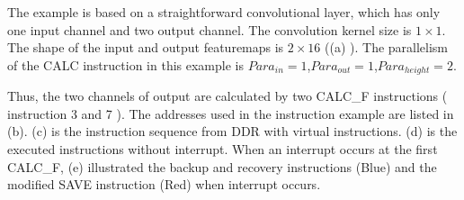 The example is based on a straightforward convolutional layer, which has only one input channel and two output channel. 
The convolution kernel size is $1 \times 1$. The shape of the input and output featuremaps is $ 2 \times 16 $ ((a) ). The parallelism of the CALC instruction in this example is $ Para_{in} = 1$,$ Para_{out}=1$,$Para_{height}=2$.

Thus, the two channels of output are calculated by two CALC\_F instructions ( instruction 3 and 7 ). The addresses used in the instruction example are listed in (b). (c) is the instruction sequence from DDR with virtual instructions. (d) is the executed instructions without interrupt. When an interrupt occurs at the first CALC\_F, (e) illustrated the backup and recovery instructions (Blue) and the modified SAVE instruction (Red) when interrupt occurs.

